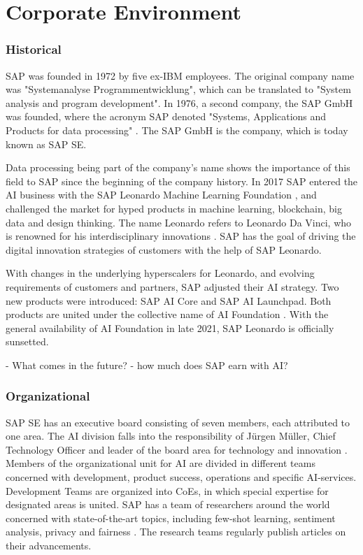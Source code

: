 \chapter{Corporate Environment}

	\subsection{Historical}
	SAP was founded in 1972 by five ex-IBM employees. The original company name was "Systemanalyse Programmentwicklung", which can be translated to "System analysis and program development". In 1976, a second company, the SAP GmbH was founded, where the acronym SAP denoted "Systems, Applications and Products for data processing" \cite{GeschichteSAP1972}. The SAP GmbH is the company, which is today known as SAP SE. 
	
	Data processing being part of the company's name shows the importance of this field to SAP since the beginning of the company history.
	In 2017 SAP entered the AI business with the SAP Leonardo Machine Learning Foundation \cite{rutschmannSAPLeonardo2021}, and challenged the market for hyped products in machine learning, blockchain, big data and design thinking. The name Leonardo refers to Leonardo Da Vinci, who is renowned for his interdisciplinary innovations \cite{schmitzLeonardo}. SAP has the goal of driving the digital innovation strategies of customers with the help of SAP Leonardo.
	
	
	With changes in the underlying hyperscalers for Leonardo, and evolving requirements of customers and partners, SAP adjusted their AI strategy. Two new products were introduced: SAP AI Core and SAP AI Launchpad. Both products are united under the collective name of AI Foundation \cite{rutschmannSAPLeonardo2021}. With the general availability of AI Foundation in late 2021, SAP Leonardo is officially sunsetted.

	- What comes in the future?
	- how much does SAP earn with AI?
	
	\subsection{Organizational}
	SAP SE has an executive board consisting of seven members, each attributed to one area. The \ac{AI} division falls into the responsibility of Jürgen Müller, Chief Technology Officer and leader of the board area for technology and innovation \cite{JuergenMuellerBiography}.
	Members of the organizational unit for \ac{AI} are divided in different teams concerned with development, product success, operations and specific \ac{AI}-services. Development Teams are organized into \acp{CoE}, in which special expertise for designated areas is united.
	SAP has a team of researchers around the world concerned with state-of-the-art topics, including few-shot learning, sentiment analysis, privacy and fairness \cite{AIOverviewResearch}. The research teams regularly publish articles on their advancements.
